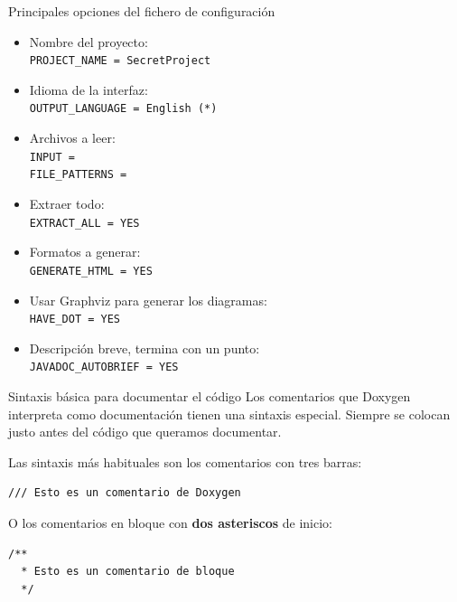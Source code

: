 \documentclass{beamer}
\begin{document}
\begin{frame}{Principales opciones del fichero de configuración}
  \begin{itemize}
  \item Nombre del proyecto: \\ 
    \texttt{PROJECT\_NAME = SecretProject}
  \item Idioma de la interfaz: \\ 
    \texttt{OUTPUT\_LANGUAGE = English (*)}
  \item Archivos a leer: \\
    \texttt{INPUT =  \\ FILE\_PATTERNS = }
  \item Extraer todo: \\
    \texttt{EXTRACT\_ALL = YES \\ }
  \item Formatos a generar: \\
    \texttt{GENERATE\_HTML = YES}
  \item Usar Graphviz para generar los diagramas: \\
    \texttt{HAVE\_DOT = YES}
  \item Descripción breve, termina con un punto: \\
    \texttt{JAVADOC\_AUTOBRIEF = YES}
  \end{itemize}
\end{frame}


\begin{frame}[fragile=singleslide]{Sintaxis básica para documentar el código}
  Los comentarios que Doxygen interpreta como documentación tienen una sintaxis
  especial. Siempre se colocan justo antes del código que queramos documentar.

  \medskip

  Las sintaxis más habituales son los comentarios con tres barras:

\begin{lstlisting}
/// Esto es un comentario de Doxygen
\end{lstlisting}

  \medskip

  O los comentarios en bloque con \textbf{dos asteriscos} de inicio:

\begin{lstlisting}
/**
  * Esto es un comentario de bloque
  */
\end{lstlisting}
  \medskip

\end{frame}
\end{document}
